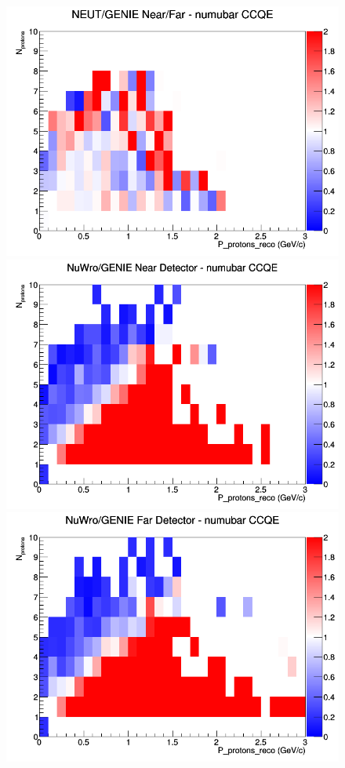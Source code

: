 \begin{figure}[h]
\endminipage
{}
\includegraphics[width=\linewidth]{eff_N_P/LAr/protons/ratios/CCQE_NEUT_GENIE_numubar_NF_N_P.png}
\endminipage
\newline
{}
\includegraphics[width=\linewidth]{eff_N_P/LAr/protons/ratios/CCQE_NuWro_GENIE_numubar_near_N_P.png}
\endminipage
{}
\includegraphics[width=\linewidth]{eff_N_P/LAr/protons/ratios/CCQE_NuWro_GENIE_numubar_far_N_P.png}

\end{figure}
